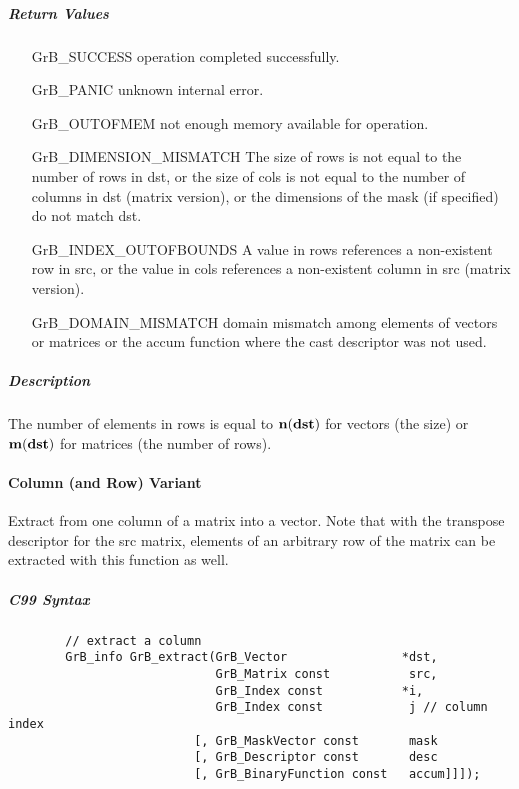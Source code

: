 \subparagraph{Return Values}


\begin{itemize}[leftmargin=2.1in]
\item[{\sf GrB\_SUCCESS}]     operation completed successfully.
\item[{\sf GrB\_PANIC}]        unknown internal error.
\item[{\sf GrB\_OUTOFMEM}]    not enough memory available for operation.
\item[{\sf GrB\_DIMENSION\_MISMATCH}] 
        The size of rows is not equal to the number of rows in dst, or
        the size of cols is not equal to the number of columns in dst (matrix version), or
        the dimensions of the mask (if specified) do not match dst.
\item[{\sf GrB\_INDEX\_OUTOFBOUNDS}]
        A value in rows references a non-existent row in src, or
        the value in cols references a non-existent column in src (matrix version).
\item[\sf GrB\_DOMAIN\_MISMATCH]  
       domain mismatch among elements of vectors or matrices or the accum function where the cast descriptor was not used.
\end{itemize}


\subparagraph{Description}

The number of elements in {\sf rows} is equal to $\bold{n}({\bf dst})$ for 
vectors (the size) or $\bold{m}({\bf dst})$ for matrices (the number of rows).


\paragraph{Column (and Row) Variant}

Extract from one column of a matrix into a vector.  Note that with the transpose
descriptor for the {\sf src} matrix, elements of an arbitrary row of the matrix
can be extracted with this function as well.

\subparagraph{C99 Syntax}

\begin{verbatim}
        // extract a column
        GrB_info GrB_extract(GrB_Vector                *dst,
                             GrB_Matrix const           src, 
                             GrB_Index const           *i,
                             GrB_Index const            j // column index
                          [, GrB_MaskVector const       mask
                          [, GrB_Descriptor const       desc 
                          [, GrB_BinaryFunction const   accum]]]);
\end{verbatim}

